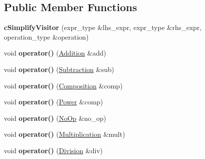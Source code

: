 \subsection*{Public Member Functions}
\begin{DoxyCompactItemize}
\item 
\hypertarget{classcSimplifyVisitor_a7116baf5a7e1d29b8b9e6ba209de560a}{{\bfseries c\-Simplify\-Visitor} (expr\-\_\-type \&lhs\-\_\-expr, expr\-\_\-type \&rhs\-\_\-expr, operation\-\_\-type \&operation)}\label{classcSimplifyVisitor_a7116baf5a7e1d29b8b9e6ba209de560a}

\item 
\hypertarget{classcSimplifyVisitor_ac14f64995cada27730ae8f68c1e84137}{void {\bfseries operator()} (\hyperlink{classAddition}{Addition} \&add)}\label{classcSimplifyVisitor_ac14f64995cada27730ae8f68c1e84137}

\item 
\hypertarget{classcSimplifyVisitor_a891f55777c75261a84665e7abead6933}{void {\bfseries operator()} (\hyperlink{classSubtraction}{Subtraction} \&sub)}\label{classcSimplifyVisitor_a891f55777c75261a84665e7abead6933}

\item 
\hypertarget{classcSimplifyVisitor_a0d4b5ebd33ec3b2af510b41d12d20ca7}{void {\bfseries operator()} (\hyperlink{classComposition}{Composition} \&comp)}\label{classcSimplifyVisitor_a0d4b5ebd33ec3b2af510b41d12d20ca7}

\item 
\hypertarget{classcSimplifyVisitor_ad596931d1797109a2d83a56272b4372f}{void {\bfseries operator()} (\hyperlink{classPower}{Power} \&comp)}\label{classcSimplifyVisitor_ad596931d1797109a2d83a56272b4372f}

\item 
\hypertarget{classcSimplifyVisitor_a02340d55ffd3a747240161218c4e69b6}{void {\bfseries operator()} (\hyperlink{structNoOp}{No\-Op} \&no\-\_\-op)}\label{classcSimplifyVisitor_a02340d55ffd3a747240161218c4e69b6}

\item 
\hypertarget{classcSimplifyVisitor_a4c39d0f1a0978d396e066406a033a08a}{void {\bfseries operator()} (\hyperlink{classMultiplication}{Multiplication} \&mult)}\label{classcSimplifyVisitor_a4c39d0f1a0978d396e066406a033a08a}

\item 
\hypertarget{classcSimplifyVisitor_ac5366d29a76278b27b492d8c9c087af4}{void {\bfseries operator()} (\hyperlink{classDivision}{Division} \&div)}\label{classcSimplifyVisitor_ac5366d29a76278b27b492d8c9c087af4}

\end{DoxyCompactItemize}
